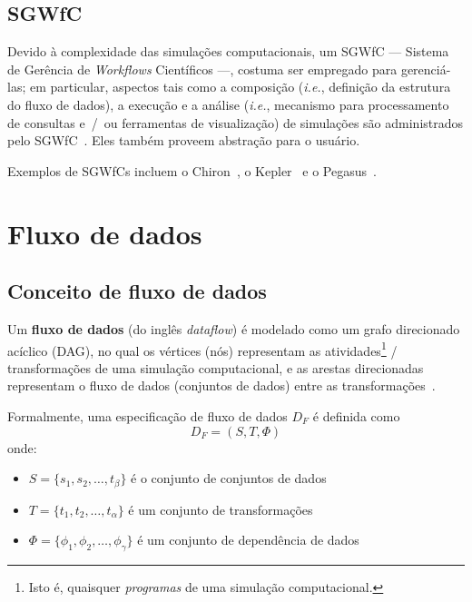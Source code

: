 \subsection{SGWfC}

Devido à complexidade das simulações computacionais, um SGWfC --- Sistema de Gerência de \textit{Workflows} Científicos ---, costuma ser empregado para gerenciá-las; em particular, aspectos tais como a composição (\textit{i.e.}, definição da estrutura do fluxo de dados), a execução e a análise (\textit{i.e.}, mecanismo para processamento de consultas e~/~ou ferramentas de visualização) de simulações são administrados pelo SGWfC~\cite{silva2015propostadoutorado}. Eles também proveem abstração para o usuário.

Exemplos de SGWfCs incluem o Chiron~\cite{ogasawara2013chiron}, o Kepler~\cite{ludascher2006scientific} e o Pegasus~\cite{deelman2005pegasus}.

\section{Fluxo de dados}%
\label{sec:dataflow}




\subsection{Conceito de fluxo de dados} %

Um \textbf{fluxo de dados} (do inglês \textit{dataflow}) é modelado como um grafo direcionado acíclico (DAG), no qual os vértices (nós) representam as atividades\footnote{Isto é, quaisquer \emph{programas} de uma simulação computacional.} / transformações de uma simulação computacional, e as arestas direcionadas representam o fluxo de dados (conjuntos de dados) entre as transformações~\cite{ogasawara2011algebraic}.

Formalmente, uma especificação de fluxo de dados \( D_F \) é definida como \[ D_F = (S, T, \Phi) \] onde:
\begin{itemize}
    \item \( S = \{s_1, s_2, \ldots, t_{\beta}\} \) é o conjunto de conjuntos de dados
    \item \( T = \{t_1, t_2, \ldots, t_{\alpha}\} \) é um conjunto de transformações
    \item \( \Phi = \{\phi_1, \phi_2, \ldots, \phi_{\gamma}\} \) é um conjunto de dependência de dados
\end{itemize}

